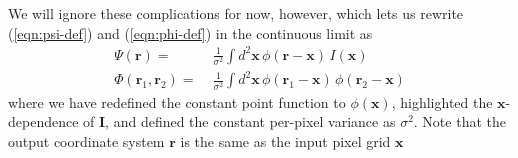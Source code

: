 \documentclass[10pt]{article}
\newcommand{\eqnref}[1]{(\ref{eqn:#1})}
\begin{document}
We will ignore these complications for now, however, which lets us rewrite \eqnref{psi-def} and \eqnref{phi-def} in the continuous limit as
\begin{align}
\Psi(\bm{r}) =\;& \frac{1}{\sigma^2} \int\!d^2\bm{x}\,
    \phi(\bm{r}-\bm{x}) \, I(\bm{x})
    \\
\Phi(\bm{r}_1,\bm{r}_2) =\;&
    \frac{1}{\sigma^2} \int\!d^2\bm{x}\,
    \phi(\bm{r}_1-\bm{x}) \, \phi(\bm{r}_2-\bm{x})
\end{align}
where we have redefined the constant point function to $\phi(\bm{x})$, highlighted the $\bm{x}$-dependence of $\bm{I}$, and defined the constant per-pixel variance as $\sigma^2$.  Note that the output coordinate system $\bm{r}$ is the same as the input pixel grid $\bm{x}$





\end{document}
